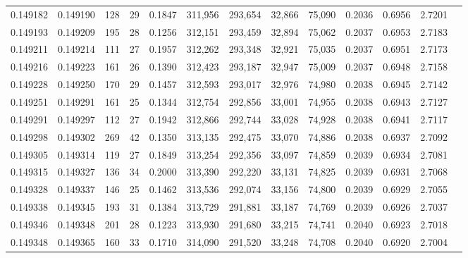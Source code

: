 \begin{tabular}{rrrrrrrrrrrrr}
0.149182 & 0.149190 &   128 &  29 &                                     0.1847 & 311,956 & 293,654 &  32,866 &  75,090 & 0.2036 & 0.6956 & 2.7201 \\
0.149193 & 0.149209 &   195 &  28 &                                     0.1256 & 312,151 & 293,459 &  32,894 &  75,062 & 0.2037 & 0.6953 & 2.7183 \\
0.149211 & 0.149214 &   111 &  27 &                                     0.1957 & 312,262 & 293,348 &  32,921 &  75,035 & 0.2037 & 0.6951 & 2.7173 \\
0.149216 & 0.149223 &   161 &  26 &                                     0.1390 & 312,423 & 293,187 &  32,947 &  75,009 & 0.2037 & 0.6948 & 2.7158 \\
0.149228 & 0.149250 &   170 &  29 &                                     0.1457 & 312,593 & 293,017 &  32,976 &  74,980 & 0.2038 & 0.6945 & 2.7142 \\
0.149251 & 0.149291 &   161 &  25 &                                     0.1344 & 312,754 & 292,856 &  33,001 &  74,955 & 0.2038 & 0.6943 & 2.7127 \\
0.149291 & 0.149297 &   112 &  27 &                                     0.1942 & 312,866 & 292,744 &  33,028 &  74,928 & 0.2038 & 0.6941 & 2.7117 \\
0.149298 & 0.149302 &   269 &  42 &                                     0.1350 & 313,135 & 292,475 &  33,070 &  74,886 & 0.2038 & 0.6937 & 2.7092 \\
0.149305 & 0.149314 &   119 &  27 &                                     0.1849 & 313,254 & 292,356 &  33,097 &  74,859 & 0.2039 & 0.6934 & 2.7081 \\
0.149315 & 0.149327 &   136 &  34 &                                     0.2000 & 313,390 & 292,220 &  33,131 &  74,825 & 0.2039 & 0.6931 & 2.7068 \\
0.149328 & 0.149337 &   146 &  25 &                                     0.1462 & 313,536 & 292,074 &  33,156 &  74,800 & 0.2039 & 0.6929 & 2.7055 \\
0.149338 & 0.149345 &   193 &  31 &                                     0.1384 & 313,729 & 291,881 &  33,187 &  74,769 & 0.2039 & 0.6926 & 2.7037 \\
0.149346 & 0.149348 &   201 &  28 &                                     0.1223 & 313,930 & 291,680 &  33,215 &  74,741 & 0.2040 & 0.6923 & 2.7018 \\
0.149348 & 0.149365 &   160 &  33 &                                     0.1710 & 314,090 & 291,520 &  33,248 &  74,708 & 0.2040 & 0.6920 & 2.7004 \\

\end{tabular}
